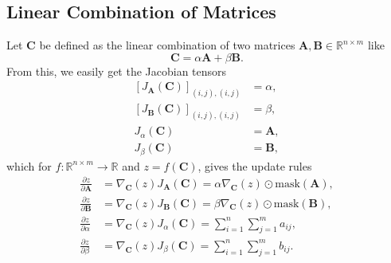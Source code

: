 \documentclass{article}
\newcommand{\mat}[1]{\bm{{#1}}}
\newcommand{\mask}[1]{\text{mask}\left( {#1} \right)}
\newcommand{\gradfn}[2]{\nabla_{{#1}}\left({#2}\right)} %
\newcommand{\jac}[2]{J_{{#1}}\left({#2}\right)} %
\newcommand{\elemwise}[2]{\left[#1\right]_{{#2}}} %
\theoremstyle{definition}
\begin{document}
\subsection{Linear Combination of Matrices}
Let $\mat{C}$ be defined as the linear combination of two matrices $\mat{A}, \mat{B} \in \mathbb{R}^{n \times m}$ like
\begin{equation}
  \mat{C} = \alpha\mat{A} + \beta\mat{B}.
\end{equation}
From this, we easily get the Jacobian tensors
\begin{align}
  \elemwise{\jac{\mat{A}}{\mat{C}}}{(i,j),(i,j)} &= \alpha, \\
  \elemwise{\jac{\mat{B}}{\mat{C}}}{(i,j),(i,j)} &= \beta, \\
  \jac{\alpha}{\mat{C}} &= \mat{A}, \\
  \jac{\beta}{\mat{C}} &= \mat{B},
\end{align}
which for $f : \mathbb{R}^{n \times m} \to \mathbb{R}$ and $z=f\left(\mat{C}\right)$, gives the update rules
\begin{align}
  \frac{\partial z}{\partial \mat{A}} &= \gradfn{\mat{C}}{z} \jac{\mat{A}}{\mat{C}} = \alpha \gradfn{\mat{C}}{z} \odot \mask{\mat{A}}, \\
  \frac{\partial z}{\partial \mat{B}} &= \gradfn{\mat{C}}{z} \jac{\mat{B}}{\mat{C}} = \beta \gradfn{\mat{C}}{z} \odot \mask{\mat{B}}, \\
  \frac{\partial z}{\partial \alpha} &= \gradfn{\mat{C}}{z} \jac{\alpha}{\mat{C}} = \sum_{i=1}^n \sum_{j=1}^m a_{ij}, \\
  \frac{\partial z}{\partial \beta} &= \gradfn{\mat{C}}{z} \jac{\beta}{\mat{C}} = \sum_{i=1}^n \sum_{j=1}^m b_{ij}.
\end{align}
\end{document}
